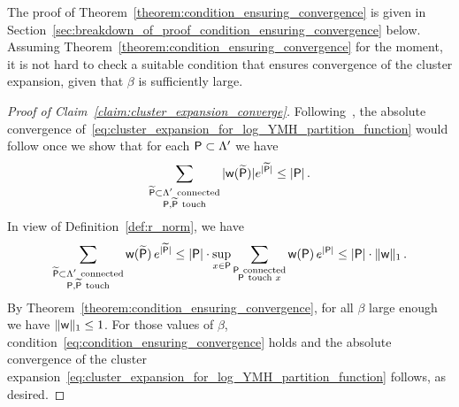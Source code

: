\documentclass[11pt]{article}
\theoremstyle{definition}
\theoremstyle{remark}
\numberwithin{theorem}{section}
\def\La{{\Lambda}}
\begin{document}
    The proof of Theorem~\ref{theorem:condition_ensuring_convergence} is given in Section~\ref{sec:breakdown_of_proof_condition_ensuring_convergence} below. Assuming Theorem~\ref{theorem:condition_ensuring_convergence} for the moment, it is not hard to check a suitable condition that ensures convergence of the cluster expansion, given that $\beta$ is sufficiently large.
    \begin{proof}[Proof of Claim~\ref{claim:cluster_expansion_converge}]
        Following~\cite[Theorem~5.4]{Friedli-Velenik_book}, the absolute convergence of~\eqref{eq:cluster_expansion_for_log_YMH_partition_function} would follow once we show that for each ${\sf P}\subset \La^\prime$ we have
        \begin{equation}
            \label{eq:condition_ensuring_convergence}
            \sum_{\substack{\widetilde {\sf P}\subset \La^\prime \ \text{connected} \\ {\sf P},\widetilde{{\sf P}} \ \text{touch}}} |{\sf w}(\widetilde {\sf P})| e^{|\widetilde{{\sf P}}|} \le |{\sf P}| \, .
        \end{equation}
        In view of Definition~\ref{def:r_norm}, we have
        \[
        \sum_{\substack{\widetilde {\sf P}\subset \La^\prime \ \text{connected} \\ {\sf P},\widetilde{{\sf P}} \ \text{touch}}} {\sf w}(\widetilde {\sf P}) \, e^{|\widetilde{{\sf P}}|} \le |{\sf P}| \cdot \sup_{x\in {\sf P}}  \sum_{\substack{{\sf P}\ \text{connected} \\ {\sf P} \  \text{touch } x }} {\sf w}({\sf P}) \,  e^{|{\sf P}|}  \le |{\sf P}| \cdot  \| {\sf w} \|_1\, .
        \]
        By Theorem~\ref{theorem:condition_ensuring_convergence}, for all $\beta$ large enough we have $\| {\sf w} \|_1\le 1$. For those values of $\beta$, condition~\eqref{eq:condition_ensuring_convergence} holds and the absolute convergence of the cluster expansion~\eqref{eq:cluster_expansion_for_log_YMH_partition_function} follows, as desired. 
    \end{proof}
\end{document}
